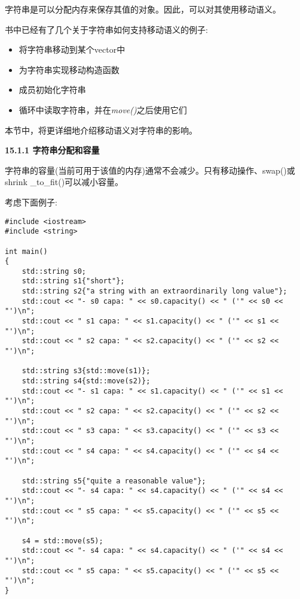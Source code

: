 字符串是可以分配内存来保存其值的对象。因此，可以对其使用移动语义。\par

书中已经有了几个关于字符串如何支持移动语义的例子:\par

\begin{itemize}
	\item 将字符串移动到某个vector中
	\item 为字符串实现移动构造函数
	\item 成员初始化字符串
	\item 循环中读取字符串，并在\textit{move()}之后使用它们
\end{itemize}

本节中，将更详细地介绍移动语义对字符串的影响。\par

\hspace*{\fill} \par %
\textbf{15.1.1 字符串分配和容量}

字符串的容量(当前可用于该值的内存)通常不会减少。只有移动操作、swap()或shrink \_to\_fit()可以减小容量。\par

考虑下面例子:\par

{\color{red}{lib/stringmoveassign.cpp}}\par

\begin{lstlisting}[caption={}]
#include <iostream>
#include <string>

int main()
{
	std::string s0;
	std::string s1{"short"};
	std::string s2{"a string with an extraordinarily long value"};
	std::cout << "- s0 capa: " << s0.capacity() << " ('" << s0 << "')\n";
	std::cout << " s1 capa: " << s1.capacity() << " ('" << s1 << "')\n";
	std::cout << " s2 capa: " << s2.capacity() << " ('" << s2 << "')\n";
	
	std::string s3{std::move(s1)};
	std::string s4{std::move(s2)};
	std::cout << "- s1 capa: " << s1.capacity() << " ('" << s1 << "')\n";
	std::cout << " s2 capa: " << s2.capacity() << " ('" << s2 << "')\n";
	std::cout << " s3 capa: " << s3.capacity() << " ('" << s3 << "')\n";
	std::cout << " s4 capa: " << s4.capacity() << " ('" << s4 << "')\n";
	
	std::string s5{"quite a reasonable value"};
	std::cout << "- s4 capa: " << s4.capacity() << " ('" << s4 << "')\n";
	std::cout << " s5 capa: " << s5.capacity() << " ('" << s5 << "')\n";
	
	s4 = std::move(s5);
	std::cout << "- s4 capa: " << s4.capacity() << " ('" << s4 << "')\n";
	std::cout << " s5 capa: " << s5.capacity() << " ('" << s5 << "')\n";
}
\end{lstlisting}


